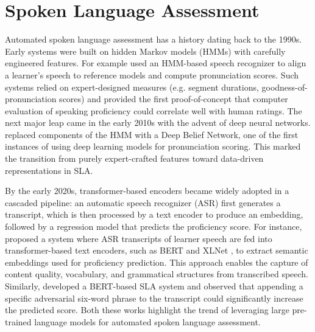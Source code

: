 \documentclass{report}
\begin{document}
\section{Spoken Language Assessment}
\label{sec:spoken_language_assessment}
Automated spoken language assessment has a history dating back to the 1990s. Early systems were built on hidden Markov models (HMMs) with carefully engineered features. For example \citet{bernstein90_icslp} used an HMM-based speech recognizer to align a learner’s speech to reference models and compute pronunciation scores. Such systems relied on expert-designed measures (e.g. segment durations, goodness-of-pronunciation scores) and provided the first proof-of-concept that computer evaluation of speaking proficiency could correlate well with human ratings. The next major leap came in the early 2010s with the advent of deep neural networks. \citet{qian12c_interspeech} replaced components of the HMM with a Deep Belief Network, one of the first instances of using deep learning models for pronunciation scoring. This marked the transition from purely expert-crafted features toward data-driven representations in SLA.

By the early 2020s, transformer-based encoders became widely adopted in a cascaded pipeline: an automatic speech recognizer (ASR) first generates a transcript, which is then processed by a text encoder to produce an embedding, followed by a regression model that predicts the proficiency score. For instance, \citet{bert_1} proposed a system where ASR transcripts of learner speech are fed into transformer-based text encoders, such as BERT \citep{devlin2019bertpretrainingdeepbidirectional} and XLNet \citep{yang2020xlnetgeneralizedautoregressivepretraining}, to extract semantic embeddings used for proficiency prediction. This approach enables the capture of content quality, vocabulary, and grammatical structures from transcribed speech. Similarly, \citet{raina20_interspeech} developed a BERT-based SLA system and observed that appending a specific adversarial six-word phrase to the transcript could significantly increase the predicted score. Both these works highlight the trend of leveraging large pre-trained language models for automated spoken language assessment.
\end{document}
